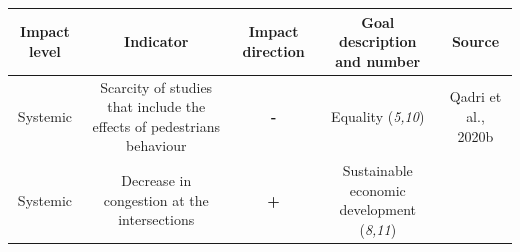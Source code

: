 \documentclass[
]{book}
\begin{document}
\begin{longtable}[]{@{}ccccc@{}}
\toprule
\begin{minipage}[b]{0.17\columnwidth}\centering
Impact level\strut
\end{minipage} & \begin{minipage}[b]{0.16\columnwidth}\centering
Indicator\strut
\end{minipage} & \begin{minipage}[b]{0.17\columnwidth}\centering
Impact direction\strut
\end{minipage} & \begin{minipage}[b]{0.17\columnwidth}\centering
Goal description and number\strut
\end{minipage} & \begin{minipage}[b]{0.17\columnwidth}\centering
Source\strut
\end{minipage}\tabularnewline
\midrule
\endhead
\begin{minipage}[t]{0.17\columnwidth}\centering
Systemic\strut
\end{minipage} & \begin{minipage}[t]{0.16\columnwidth}\centering
Scarcity of studies that include the effects of pedestrians behaviour\strut
\end{minipage} & \begin{minipage}[t]{0.17\columnwidth}\centering
\textbf{-}\strut
\end{minipage} & \begin{minipage}[t]{0.17\columnwidth}\centering
Equality (\emph{5,10})\strut
\end{minipage} & \begin{minipage}[t]{0.17\columnwidth}\centering
Qadri et al., 2020b\strut
\end{minipage}\tabularnewline
\begin{minipage}[t]{0.17\columnwidth}\centering
Systemic\strut
\end{minipage} & \begin{minipage}[t]{0.16\columnwidth}\centering
Decrease in congestion at the intersections\strut
\end{minipage} & \begin{minipage}[t]{0.17\columnwidth}\centering
\textbf{+}\strut
\end{minipage} & \begin{minipage}[t]{0.17\columnwidth}\centering
Sustainable economic development (\emph{8,11})\strut
\end{minipage} & \begin{minipage}[t]{0.17\columnwidth}\centering

\end{minipage}
\end{longtable}
\end{document}
